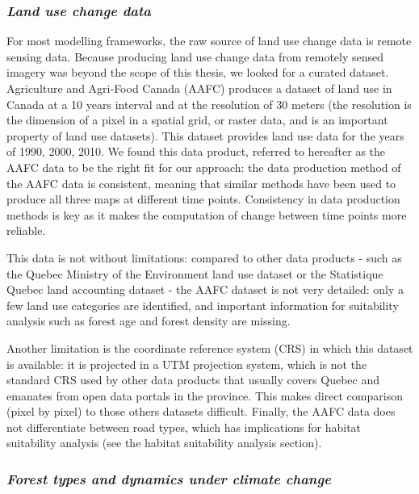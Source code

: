 \subsubsection*{\textit{Land use change data}}

For most modelling frameworks, the raw source of land use change data is remote sensing data. Because producing land use change data from remotely sensed imagery was beyond the scope of this thesis, we looked for a curated dataset. Agriculture and Agri-Food Canada (AAFC) produces a dataset of land use in Canada at a 10 years interval and at the resolution of 30 meters (the resolution is the dimension of a pixel in a spatial grid, or raster data, and is an important property of land use datasets). This dataset provides land use data for the years of 1990, 2000, 2010. We found this data product, referred to hereafter as the AAFC data  to be the right fit for our approach: the data production method of the AAFC  data is consistent, meaning that similar methods have been used to produce all three maps at different time points. Consistency in data production methods is key as it makes the computation of change between time points more reliable.

This data is not without limitations: compared to other data products - such as the Quebec Ministry of the Environment land use dataset or the Statistique Quebec land accounting dataset - the AAFC dataset is not very detailed: only a few land use categories are identified, and important information for suitability analysis such as forest age and forest density are missing.

Another limitation is the coordinate reference system (CRS) in which this dataset is available: it is projected in a UTM projection system, which is not the standard CRS used by other data products that usually covers Quebec and emanates from open data portals in the province. This makes direct comparison (pixel by pixel) to those others datasets difficult. Finally, the AAFC data does not differentiate between road types, which has implications for habitat suitability analysis (see the habitat suitability analysis section).\\

\subsubsection*{\textit{Forest types and dynamics under climate change}}

